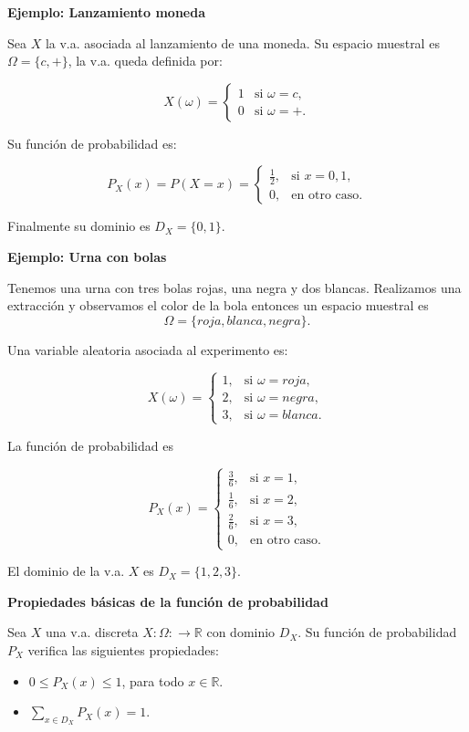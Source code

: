 \documentclass[]{book}
\providecommand{\tightlist}{%
  \setlength{\itemsep}{0pt}\setlength{\parskip}{0pt}}
\begin{document}
\textbf{Ejemplo: Lanzamiento moneda}

Sea \(X\) la v.a. asociada al lanzamiento de una moneda. Su espacio muestral es \(\Omega=\{c,+\}\), la v.a. queda definida por:

\[X(\omega)=\left\{\begin{array}{ll} 1 & \mbox{si } \omega=c, \\
0 & \mbox{si }\omega=+.\end{array}\right.\]

Su función de probabilidad es:

\[P_{X}(x)=P(X=x)=\left\{\begin{array}{ll} \frac12, & \mbox{si } x=0,1,\\
0, & \mbox{en otro caso.}\end{array}\right.\]

Finalmente su dominio es \(D_X=\{0,1\}.\)

\textbf{Ejemplo: Urna con bolas}

Tenemos una urna con tres bolas rojas, una negra y dos blancas. Realizamos una extracción y observamos el color de la bola entonces un espacio muestral es
\[\Omega=\{roja, blanca, negra\}.\]

Una variable aleatoria asociada al experimento es:

\[X(\omega)=\left\{\begin{array}{ll} 1, & \mbox{si } \omega=roja,  \\
2, & \mbox{si }\omega=negra, \\ 3, & \mbox{si } \omega=blanca. \end{array}\right.\]

La función de probabilidad es

\[P_{X}(x)=\left\{\begin{array}{ll} \frac36, & \mbox{si } x=1,\\[1ex]
\frac16, & \mbox{si } x=2,\\[1ex] \frac26, & \mbox{si } x=3,\\[1ex] 0, & \mbox{en otro
caso.}\end{array}\right.\]

El dominio de la v.a. \(X\) es \(D_X=\{1,2,3\}.\)

 \textbf{Propiedades básicas de la función de probabilidad}

Sea \(X\) una v.a. discreta \(X:\Omega:\to\mathbb{R}\) con dominio \(D_X\). Su función de probabilidad \(P_{X}\) verifica las siguientes propiedades:

\begin{itemize}
\tightlist
\item
  \(0\leq P_{X}(x)\leq 1\), para todo \(x\in\mathbb{R}\).
\item
  \(\sum\limits_{x\in D_X} P_{X}(x)=1\).
\end{itemize}
\end{document}
